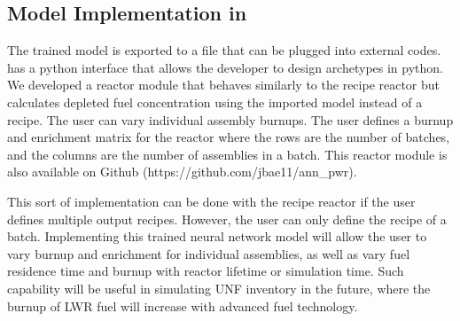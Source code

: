 \subsection{Model Implementation in \Cyclus}

The trained model is exported to a file
that can be plugged into external codes. \Cyclus
has a python interface that allows the developer
to design archetypes in python. We developed a reactor
module that behaves similarly to the recipe reactor
but calculates depleted fuel concentration using the
imported model instead of a recipe. The user can vary
individual assembly burnups. The user defines a burnup
and enrichment
matrix for the reactor where the rows are the number
of batches, and the columns are the number of
assemblies in a batch. This reactor module is also
available on Github 
(https://github.com/jbae11/ann\_pwr).

This sort of implementation can be done with
the recipe reactor if the user defines multiple
output recipes. However, the user can only define
the recipe of a batch.
Implementing this trained neural network model will allow the user to vary
burnup and enrichment for individual assemblies, as well
as vary fuel residence time and burnup with reactor
lifetime or simulation time. Such capability will be
useful in simulating \gls{UNF} inventory in the future,
where the burnup of \gls{LWR} fuel will increase
with advanced fuel technology.